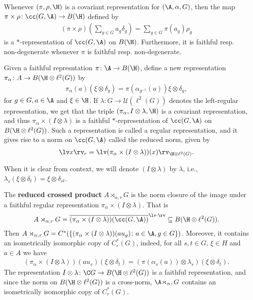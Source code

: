 \begin{remark}
Whenever $(\pi,\rho,\H)$ is a covariant representation for $(\A,\alpha,G)$, then the map $\pi \times \rho \colon \cc(G,\A) \to B(\H)$ defined by
\begin{align*}
(\pi \times \rho) \left(\sum_{g \in G}a_{g}\delta_{g} \right)= \sum_{g \in G} \pi(a_{g}) \rho_{g}
\end{align*}
is a $*$-representation of $\cc(G,\A)$ on $B(\H)$. Furthermore, it is faithful resp. non-degenerate whenever $\pi$ is faithful resp. non-degenerate.

\noindent Given a faithful represntation $\pi \colon \A \to B(\H)$, define a new representation $\pi_{\alpha} \colon A \to B(\H \otimes \ell^2(G))$ by
\begin{align*}
\pi_{\alpha}(a)(\xi \otimes \delta_{g})=\pi(\alpha_{g^{-1}}(a))\xi \otimes \delta_{g},
\end{align*} for $g \in G, a \in \A$ and $\xi \in \H $. If $\lambda \colon G \to \mathcal{U}(\ell^2(G))$ denotes the left-regular representation, we get that the triple $(\pi_{\alpha}, I \otimes \lambda,\H)$ is a covariant representation, and thus $\pi_{\alpha} \times (I \otimes \lambda)$ is a faithful $*$-representation of $\cc(G,\A)$ on $B(\H \otimes \ell^2(G))$. Such a representation is called a regular representation, and it gives rise to a norm on $\cc(G,\A)$ called the reduced norm, given by 
\begin{align*}
\lv x \rv_{r}=\lv (\pi_{\alpha} \times (I \otimes \lambda))(x)\rv_{\H \otimes \ell^2(G)}.
\end{align*}
\end{remark}
\noindent When it is clear from context, we will denote $(I \otimes \lambda)$ by $\lambda$, i.e., $\lambda_s(\xi \otimes \delta_t)=\xi \otimes \delta_{st}$.	

\begin{definition}
The \textbf{reduced crossed product} $A \rtimes_{\alpha,r}G$ is the norm closure of the image under a faithful regular representation $\pi_{\alpha} \times(I\otimes \lambda)$. That is
\begin{align*}
A \rtimes_{\alpha,r}G= \overline{(\pi_{\alpha}\times(I \otimes \lambda))(\cc(G,\A))}^{\lv \cdot \rv} \subseteq B(\H \otimes \ell^2(G)).
\end{align*}
Then $A \rtimes_{\alpha,r} G=C^*(\{(\pi_{\alpha} \times (I \otimes \lambda))(a u_{g}) \colon a \in \A, g \in G\})$. Moreover, it contains an isometrically isomorphic copy of $C_r^*(G)$,  indeed, for all $s,t \in G$, $\xi \in H$ and $a \in A$ we have 
\begin{align*}
(\pi_\alpha \times (I \otimes \lambda))(a u_s) (\xi \otimes \delta_t)=(\pi({\alpha_s}(a))\otimes \lambda_s)(\xi \otimes \delta_t).
\end{align*}
The representation $I \otimes \lambda \colon \C G \to B(\H \otimes \ell^2(G))$ is a faithful representation, and since the norm on $B(\H \otimes \ell^2(G))$ is a cross-norm, $\A \rtimes_{\alpha},G$ contains an isometrically isomorphic copy of $C_r^*(G)$.
\end{definition}

